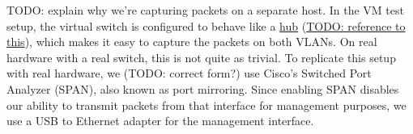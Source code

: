 TODO: explain why we're capturing packets on a separate host.
In the VM test setup, the virtual switch is configured to behave like a \href{https://en.wikipedia.org/wiki/Ethernet_hub}{hub} (\href{https://github.com/NixOS/nixpkgs/blob/0634959ae9c75ac8cab28dfcc9a0f045cf30dfc6/nixos/lib/test-driver/test_driver/vlan.py#L43}{TODO: reference to this}), which makes it easy to capture the packets on both VLANs. On real hardware with a real switch, this is not quite as trivial. To replicate this setup with real hardware, we (TODO: correct form?) use Cisco's Switched Port Analyzer (SPAN), also known as port mirroring. Since enabling SPAN disables our ability to transmit packets from that interface for management purposes, we use a USB to Ethernet adapter for the management interface.

